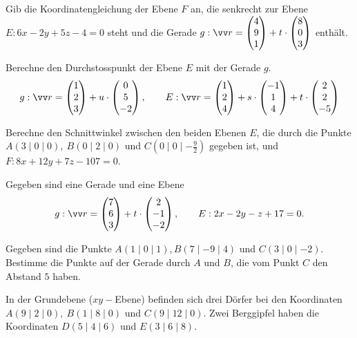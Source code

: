 \documentclass[11pt]{exam}
\begin{document}
\begin{questions}
\question[3] %
Gib die Koordinatengleichung der Ebene $F$ an, die senkrecht zur Ebene\\ ${E:6x-2y+5z-4=0}$ steht und die Gerade $g:\v{r}=\Vec{4}{9}{1}+t\*\Vec{8}{0}{3}$ enthält.


\question[4]
Berechne den Durchstosspunkt der Ebene $E$ mit der Gerade $g$.
\[g:\v{r}=\Vec{1}{2}{3}+u\*\Vec{0}{5}{-2},\qquad E:\v{r}=\Vec{1}{2}{4}+s\*\Vec{-1}{1}{4}+t\*\Vec{2}{2}{-5}\]


\question[3] %
Berechne den Schnittwinkel zwischen den beiden Ebenen $E$, die durch die Punkte $A(3\mid0\mid0),\: B(0\mid2\mid0)$ und ${C(0\mid0\mid-\frac{9}{2})}$ gegeben ist, und ${F:8x+12y+7z-107=0}$.


\noaddpoints
\question[\totalpoints]
\addpoints
Gegeben sind eine Gerade und eine Ebene \[g:\v{r}=\Vec{7}{6}{3}+t\*\Vec{2}{-1}{-2},\qquad E:2x-2y-z+17=0.\]


\question[6]
Gegeben sind die Punkte $A(1\mid 0\mid 1), B(7\mid -9\mid 4)$ und $C(3\mid 0\mid -2)$. Bestimme die Punkte auf der Gerade durch $A$ und $B$, die vom Punkt $C$ den Abstand $5$ haben.


\noaddpoints
\question[\totalpoints]
\addpoints
In der Grundebene ($xy-$Ebene) befinden sich drei Dörfer bei den Koordinaten $A(9\mid2\mid0),\: B(1\mid8\mid0)$ und $C(9\mid12\mid0)$. Zwei Berggipfel haben die Koordinaten $D(5\mid4\mid6)$ und $E(3\mid6\mid8)$.\\
\begin{minipage}{0.6\linewidth}
\end{minipage}
\end{questions}
\end{document}
